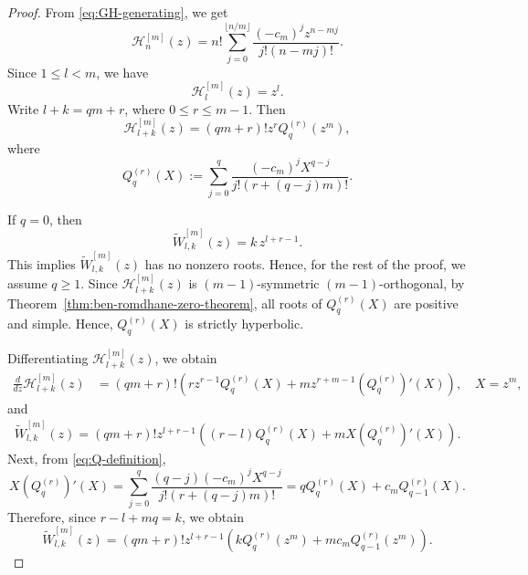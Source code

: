 \documentclass[preprint,3p,10pt]{elsarticle}
\theoremstyle{definition}
\begin{document}
\begin{proof}
From \eqref{eq:GH-generating}, we get
\begin{equation}\label{eq:GH-expansion}
    \mathcal H_n^{[m]}(z)
    =
    n!\sum_{j=0}^{\lfloor n/m\rfloor}
    \frac{(-c_m)^jz^{n-mj}}{j!(n-mj)!}.
\end{equation}
Since \(1\leq l<m\), we have
\begin{equation}\label{eq:GH-l}
    \mathcal H_l^{[m]}(z)=z^l.
\end{equation}
Write \(l+k=qm+r\), where $0 \le r\le m-1$. Then
\begin{equation}
    \mathcal H_{l+k}^{[m]}(z)
    =
    (qm+r)!z^rQ_q^{(r)}(z^m),
\end{equation}
where
\begin{equation}\label{eq:Q-definition}
    Q_q^{(r)}(X)
    :=
    \sum_{j=0}^{q}
    \frac{(-c_m)^jX^{q-j}}{j!(r+(q-j)m)!}.
\end{equation}


If \(q=0\), then
\begin{equation}
    \widetilde W_{l,k}^{[m]}(z)=k\,z^{l+r-1}.
\end{equation}
This implies $\widetilde W_{l,k}^{[m]}(z)$ has no nonzero roots. Hence, for the rest of the proof, we
assume \(q\geq1\). Since \(\mathcal H_{l+k}^{[m]}(z)\) is $(m-1)$-symmetric $(m-1)$-orthogonal,  by Theorem~\ref{thm:ben-romdhane-zero-theorem}, all
roots of \(Q_q^{(r)}(X)\) are positive and simple. Hence, \(Q_q^{(r)}(X)\) is strictly hyperbolic.

Differentiating
\(\mathcal H_{l+k}^{[m]}(z)\), we obtain
\begin{align}
    \frac{d}{dz}\mathcal H_{l+k}^{[m]}(z)
    &=
    (qm+r)!
    \left(
        rz^{r-1}Q_q^{(r)}(X)
        +
        mz^{r+m-1}\left(Q_q^{(r)}\right)'(X)
    \right), \quad X=z^m,
\end{align}
and
\begin{align}
    \widetilde W_{l,k}^{[m]}(z)
   =
    (qm+r)!z^{l+r-1}
    \left(
        (r-l)Q_q^{(r)}(X)
        +
        mX\left(Q_q^{(r)}\right)'(X)
    \right).
\end{align}
Next, from \eqref{eq:Q-definition},
\begin{equation}
    X\left(Q_q^{(r)}\right)'(X)
    =
    \sum_{j=0}^{q}
    \frac{(q-j)(-c_m)^jX^{q-j}}{j!(r+(q-j)m)!}
    =
    qQ_q^{(r)}(X)
    +
    c_mQ_{q-1}^{(r)}(X).
\end{equation}
Therefore, since \(r-l+mq=k\), we obtain
\begin{equation}\label{eq:GH-Wr-factorization}
    \widetilde W_{l,k}^{[m]}(z)
    =
    (qm+r)!z^{l+r-1}
    \left(kQ_q^{(r)}(z^m)+mc_mQ_{q-1}^{(r)}(z^m)\right).
\end{equation}


\end{proof}
\end{document}
